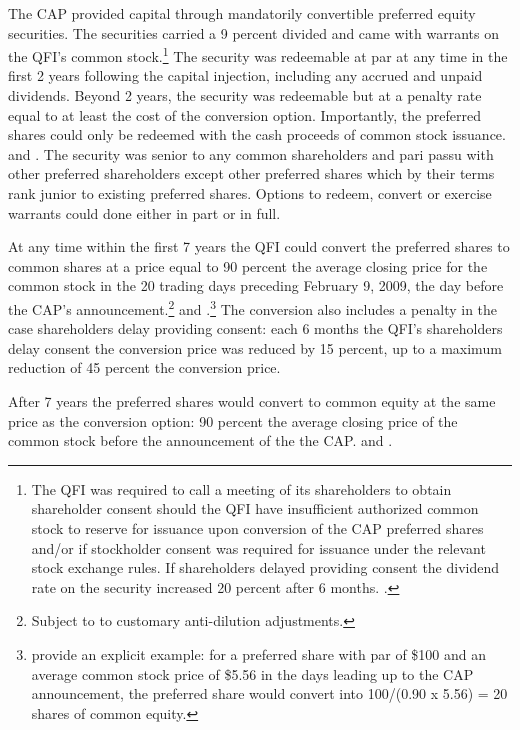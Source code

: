 \documentclass[12pt]{article}
\begin{document}
The CAP provided capital through mandatorily convertible preferred equity securities. The securities carried a 9 percent divided and came with warrants on the QFI's common stock.\footnote{The QFI was required to call a meeting of its shareholders to obtain shareholder consent should the QFI have insufficient authorized common stock to reserve for issuance upon conversion of the CAP preferred shares and/or if stockholder consent was required for issuance under the relevant stock exchange rules. If shareholders delayed providing consent the dividend rate on the security increased 20 percent after 6 months. \citep{CAPTerms}.} The security was redeemable at par at any time in the first 2 years following the capital injection, including any accrued and unpaid dividends. Beyond 2 years, the security was redeemable but at a penalty rate equal to at least the cost of the conversion option. Importantly, the preferred shares could only be redeemed with the cash proceeds of common stock issuance. \citep{WhitePaper} and \citep{GW}. The security was senior to any common shareholders and pari passu with other preferred shareholders except other preferred shares which by their terms rank junior to existing preferred shares. Options to redeem, convert or exercise warrants could done either in part or in full. \citep{CAPTerms}


At any time within the first 7 years the QFI could convert the preferred shares to common shares at a price equal to 90 percent the average closing price for the common stock in the 20 trading days preceding February 9, 2009, the day before the CAP's announcement.\footnote{Subject to to customary anti-dilution adjustments.} \citep{WhitePaper} and \citep{GW}.\footnote{\citet{GW} provide an explicit example: for a preferred share with par of \$100 and an average common stock price of \$5.56 in the days leading up to the CAP announcement, the preferred share would convert into 100/(0.90 x 5.56) = 20 shares of common equity.} The conversion also includes a penalty in the case shareholders delay providing consent: each 6 months the QFI's shareholders delay consent the conversion price was reduced by 15 percent, up to a maximum reduction of 45 percent the conversion price.


After 7 years the preferred shares would convert to common equity at the same price as the conversion option: 90 percent the average closing price of the common stock before the announcement of the the CAP. \citep{WhitePaper} and \citep{GW}.
\end{document}
